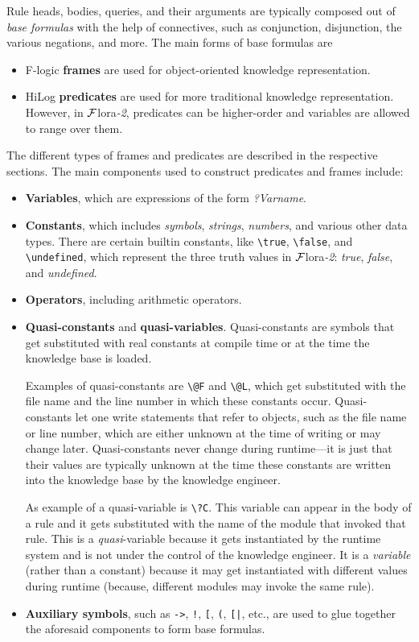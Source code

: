 \documentclass[11pt]{article}
\newcommand{\FLORA}{{\mbox{\sc ${\cal F}${lora}\rm\emph{-2}}}\xspace}
\newcommand{\FLSYSTEM}{\FLORA}
\newcommand{\bs}{\textbackslash}
\begin{document}
Rule heads, bodies, queries, and their arguments are typically composed out
of \emph{base formulas} with the help of connectives, such as
conjunction, disjunction, the various negations, and more. The main forms
of base formulas are
\begin{itemize}
\item  F-logic \textbf{frames} are used for
  object-oriented knowledge representation.
\item  HiLog \textbf{predicates} are used for more traditional knowledge
  representation. However, in \FLSYSTEM, predicates can be higher-order and
  variables are allowed to range over them.
\end{itemize}
The different types of frames and predicates are described in the
respective sections.
The main components used to construct predicates and frames include:
\begin{itemize}
\item  \textbf{Variables}, which are expressions of the form \emph{?Varname}.
  \index{\bs{}true}
  \index{\bs{}false}
  \index{\bs{}undefined}
\item  \textbf{Constants}, which includes \emph{symbols},  \emph{strings},
  \emph{numbers}, and various other data types.
  There are certain builtin constants, like \texttt{\bs{}true},
  \texttt{\bs{}false}, and \texttt{\bs{}undefined}, which represent the
  three truth values in \FLSYSTEM: \emph{true}, \emph{false}, and \emph{undefined}.    
\item \textbf{Operators}, including arithmetic operators.
\item \textbf{Quasi-constants} and
  \textbf{quasi-variables}. Quasi-constants are symbols that get substituted
  with real constants at compile time or at the time the knowledge base is
  loaded.
  
  Examples of quasi-constants are \texttt{\bs{}@F} and \texttt{\bs{}@L},
  which get substituted with the file name and the line number in which
  these constants occur. Quasi-constants let one write
  statements that refer to objects, such as the file name or line
  number, which are either unknown at the time of writing or may change
  later.  Quasi-constants never change during runtime---it is just that
  their values are typically unknown at the time these constants are
  written into the knowledge base by the knowledge engineer.

  As example of a quasi-variable is \texttt{\bs{}?C}. This variable can
  appear in the body of a rule and it gets substituted
  with the name of the module that invoked that rule. This is
  a \emph{quasi}-variable because it gets 
  instantiated by the runtime system and is not under the control of the
  knowledge engineer. It is a \emph{variable} (rather than a constant) because
  it may get instantiated with different values during runtime (because,
  different modules may invoke the same rule).
\item \textbf{Auxiliary symbols}, such as \texttt{->}, \texttt{!},
  \texttt{[}, \texttt{(}, \texttt{[|},   etc., are used to glue together     
  the aforesaid components to form base formulas.
\end{itemize}
\end{document}
